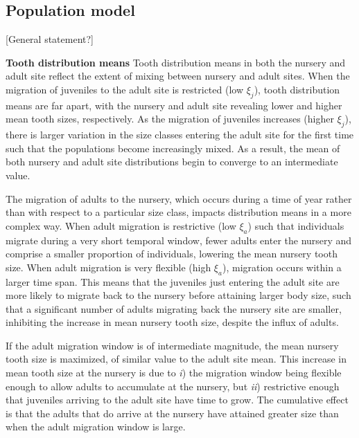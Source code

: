 \documentclass[]{rsos}%
\begin{document}
\subsection{Population model}
[General statement?]

\textbf{Tooth distribution means} Tooth distribution means in both the nursery and adult site reflect the extent of mixing between nursery and adult sites.
When the migration of juveniles to the adult site is restricted (low $\xi_j$), tooth distribution means are far apart, with the nursery and adult site revealing lower and higher mean tooth sizes, respectively.
As the migration of juveniles increases (higher $\xi_j$), there is larger variation in the size classes entering the adult site for the first time such that the populations become increasingly mixed.
As a result, the mean of both nursery and adult site distributions begin to converge to an intermediate value.

The migration of adults to the nursery, which occurs during a time of year rather than with respect to a particular size class, impacts distribution means in a more complex way.
When adult migration is restrictive (low $\xi_a$) such that individuals migrate during a very short temporal window, fewer adults enter the nursery and comprise a smaller proportion of individuals, lowering the mean nursery tooth size.
When adult migration is very flexible (high $\xi_a$), migration occurs within a larger time span.
This means that the juveniles just entering the adult site are more likely to migrate back to the nursery before attaining larger body size, such that a significant number of adults migrating back the nursery site are smaller, inhibiting the increase in mean nursery tooth size, despite the influx of adults.

If the adult migration window is of intermediate magnitude, the mean nursery tooth size is maximized, of similar value to the adult site mean.
This increase in mean tooth size at the nursery is due to \emph{i}) the migration window being flexible enough to allow adults to accumulate at the nursery, but \emph{ii}) restrictive enough that juveniles arriving to the adult site have time to grow.
The cumulative effect is that the adults that do arrive at the nursery have attained greater size than when the adult migration window is large.
\end{document}
